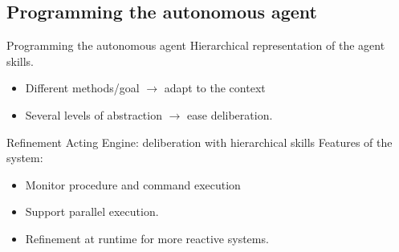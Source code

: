 \subsection{Programming the autonomous agent}

\begin{frame}{Programming the autonomous agent}
    Hierarchical representation of the agent skills.
    \begin{itemize}
        \pause
        \item Different methods/goal $\rightarrow$ adapt to the context
        \pause
        \item Several levels of abstraction $\rightarrow$ ease deliberation.
    \end{itemize}
   
\end{frame}

\begin{frame}{Refinement Acting Engine: deliberation with hierarchical skills}
    Features of the system:
    \begin{itemize}
        \pause
        \item Monitor procedure and command execution
        \pause
        \item Support parallel execution.
        \pause
        \item Refinement at runtime for more reactive systems.
    \end{itemize}
\end{frame}

